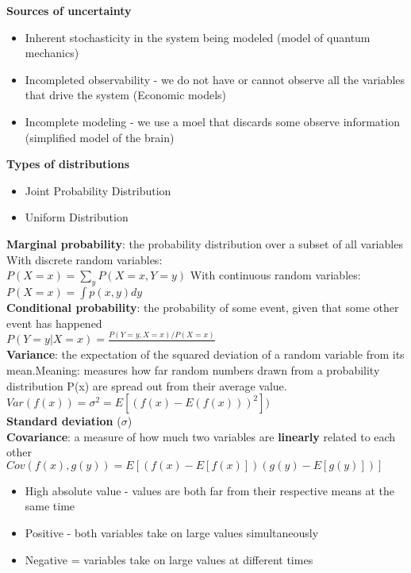 \documentclass{article}
\begin{document}
\textbf{Sources of uncertainty}\\
\begin{itemize}
    \item Inherent stochasticity in the system being modeled (model of quantum mechanics)
    \item Incompleted observability - we do not have or cannot observe all the variables that drive the system (Economic models)
    \item Incomplete modeling - we use a moel that discards some observe information (simplified model of the brain)
\end{itemize}
\textbf{Types of distributions}
\begin{itemize}
    \item Joint Probability Distribution
    \item Uniform Distribution
\end{itemize}
\textbf{Marginal probability}: the probability distribution over a subset of all variables\\
With discrete random variables:\\
$P(X = x) = \sum_{y}^{}P(X = x, Y = y)$
With continuous random variables:\\
$P(X = x) = \int p(x,y)dy$\\
\newline
\textbf{Conditional probability}: the probability of some event, given that some other event has happened\\
$P(Y=y|X=x)=\frac{P(Y=y, X=x)/P(X=x)}{}$\\
\newline
\textbf{Variance}: the expectation of the squared deviation of a random variable from its mean.Meaning: measures how far random numbers drawn from a probability distribution P(x) are spread out from their average value.\\
$Var(f(x)) = \sigma^2 = E[(f(x) - E(f(x)))^2] )$\\
\textbf{Standard deviation }($\sigma$)\\
\textbf{Covariance}: a measure of how much two variables are \textbf{linearly} related to each other\\
$Cov(f(x), g(y)) = E[(f(x)-E[f(x)])(g(y) - E[g(y)])]$\\
\begin{itemize}
    \item High absolute value - values are both far from their respective means at the same time
    \item Positive - both variables take on large values simultaneously
    \item Negative = variables take on large values at different times
\end{itemize}
\end{document}
